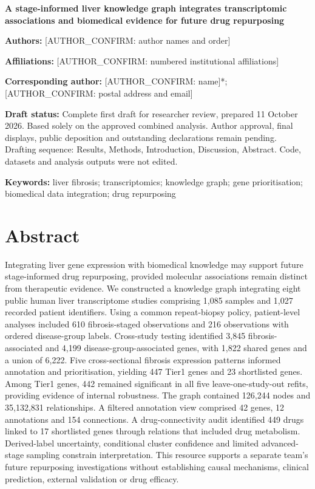 \documentclass[11pt,a4paper]{article}
\begin{document}
{\centering\Large\bfseries A stage-informed liver knowledge graph integrates transcriptomic associations and biomedical evidence for future drug repurposing\par}

\textbf{Authors:} [AUTHOR\_CONFIRM: author names and order]

\textbf{Affiliations:} [AUTHOR\_CONFIRM: numbered institutional affiliations]

\textbf{Corresponding author:} [AUTHOR\_CONFIRM: name]*; [AUTHOR\_CONFIRM: postal address and email]

\textbf{Draft status:} Complete first draft for researcher review, prepared 11 October 2026. Based solely on the approved combined analysis. Author approval, final displays, public deposition and outstanding declarations remain pending. Drafting sequence: Results, Methods, Introduction, Discussion, Abstract. Code, datasets and analysis outputs were not edited.

\textbf{Keywords:} liver fibrosis; transcriptomics; knowledge graph; gene prioritisation; biomedical data integration; drug repurposing

\section*{Abstract}
Integrating liver gene expression with biomedical knowledge may support future stage-informed drug repurposing, provided molecular associations remain distinct from therapeutic evidence. We constructed a knowledge graph integrating eight public human liver transcriptome studies comprising 1,085 samples and 1,027 recorded patient identifiers. Using a common repeat-biopsy policy, patient-level analyses included 610 fibrosis-staged observations and 216 observations with ordered disease-group labels. Cross-study testing identified 3,845 fibrosis-associated and 4,199 disease-group-associated genes, with 1,822 shared genes and a union of 6,222. Five cross-sectional fibrosis expression patterns informed annotation and prioritisation, yielding 447 Tier1 genes and 23 shortlisted genes. Among Tier1 genes, 442 remained significant in all five leave-one-study-out refits, providing evidence of internal robustness. The graph contained 126,244 nodes and 35,132,831 relationships. A filtered annotation view comprised 42 genes, 12 annotations and 154 connections. A drug-connectivity audit identified 449 drugs linked to 17 shortlisted genes through relations that included drug metabolism. Derived-label uncertainty, conditional cluster confidence and limited advanced-stage sampling constrain interpretation. This resource supports a separate team's future repurposing investigations without establishing causal mechanisms, clinical prediction, external validation or drug efficacy.
\end{document}

